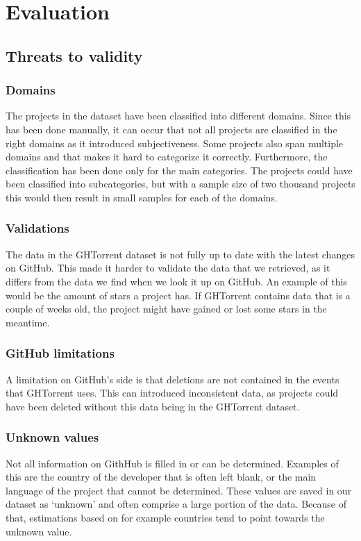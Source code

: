 \section{Evaluation}

\subsection{Threats to validity}

\subsubsection{Domains}
The projects in the dataset have been classified into different domains.
Since this has been done manually, it can occur that not all projects are classified in the right domains as it introduced subjectiveness.
Some projects also span multiple domains and that makes it hard to categorize it correctly.
Furthermore, the classification has been done only for the main categories.
The projects could have been classified into subcategories, but with a sample size of two thousand projects this would then result in small samples for each of the domains.

\subsubsection{Validations}
The data in the GHTorrent dataset is not fully up to date with the latest changes on GitHub.
This made it harder to validate the data that we retrieved, as it differs from the data we find when we look it up on GitHub.
An example of this would be the amount of stars a project has.
If GHTorrent contains data that is a couple of weeks old, the project might have gained or lost some stars in the meantime.

\subsubsection{GitHub limitations}
A limitation on GitHub's side is that deletions are not contained in the events that GHTorrent uses.
This can introduced inconsistent data, as projects could have been deleted without this data being in the GHTorrent dataset.

\subsubsection{Unknown values}
Not all information on GithHub is filled in or can be determined.
Examples of this are the country of the developer that is often left blank, or the main language of the project that cannot be determined.
These values are saved in our dataset as `unknown' and often comprise a large portion of the data.
Because of that, estimations based on for example countries tend to point towards the unknown value.